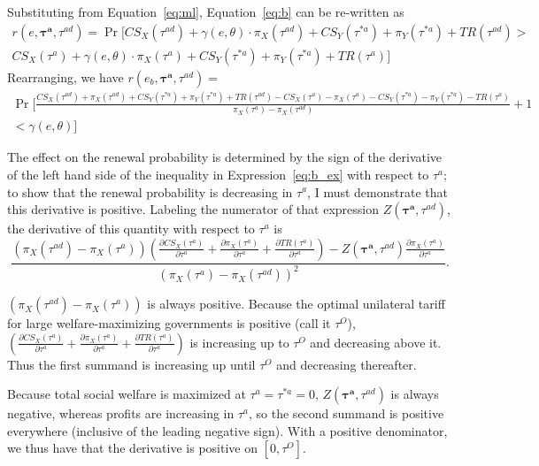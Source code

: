 \documentclass[10pt]{article}
\newcommand{\ve}{\theta}
\newcommand{\bta}{\bm{\tau^a}}
\newcommand{\tad}{\tau^{ad}}
\newcommand{\ga}{\gamma}
\begin{document}
Substituting from Equation~\ref{eq:ml}, Equation~\ref{eq:b} can be re-written as
\begin{multline}  
  r(e,\bta,\tad) = \Pr [ \mathit{CS}_X(\tad) + \ga(e,\ve) \cdot \pi_X(\tad) + \mathit{CS}_Y(\tau^{*a}) + \pi_Y(\tau^{*a}) + \mathit{TR}(\tad) >  \\ \mathit{CS}_X(\tau^a) + \ga(e,\ve) \cdot \pi_X(\tau^a) + \mathit{CS}_Y(\tau^{*a}) + \pi_Y(\tau^{*a}) + \mathit{TR}(\tau^a) ]
\end{multline}
Rearranging, we have $r(e_b,\bta,\tad) = $
\begin{multline}  
  \textstyle \Pr \Big[ \frac{\mathit{CS}_X(\tad) + \pi_X(\tad) + \mathit{CS}_Y(\tau^{*a}) + \pi_Y(\tau^{*a}) + \mathit{TR}(\tad)  -\mathit{CS}_X(\tau^a) - \pi_X(\tau^a) - \mathit{CS}_Y(\tau^{*a}) - \pi_Y(\tau^{*a}) - \mathit{TR}(\tau^a)}{\pi_X(\tau^a) - \pi_X(\tad)} + 1 \\ \textstyle < \ga(e,\ve) \Big]
  \label{eq:b_ex}
\end{multline}

The effect on the renewal probability is determined by the sign of the derivative of the left hand side of the inequality in Expression~\ref{eq:b_ex} with respect to $\tau^a$; to show that the renewal probability is decreasing in $\tau^a$, I must demonstrate that this derivative is positive. Labeling the numerator of that expression $Z(\bta,\tad)$, the derivative of this quantity with respect to $\tau^{a}$ is 
\begin{equation}
  \frac{\left(\pi_X(\tad) - \pi_X(\tau^a)\right)\left(\frac{\partial \mathit{CS}_X(\tau^{a})}{\partial \tau^{a}} + \frac{\partial \pi_X(\tau^a)}{\partial \tau^{a}} + \frac{\partial \mathit{TR}(\tau^{a})}{\partial \tau^{a}}\right) - Z(\bta,\tad) \frac{\partial \pi_X(\tau^a)}{\partial \tau^a}}{\left(\pi_X(\tau^a) - \pi_X(\tad)\right)^2}.
  \label{appex:a}
\end{equation}

\noindent $\left(\pi_X(\tad) - \pi_X(\tau^a)\right)$ is always positive. Because the optimal unilateral tariff for large welfare-maximizing governments is positive (call it $\tau^O$), $\left(\frac{\partial \mathit{CS}_X(\tau^{a})}{\partial \tau^{a}} + \frac{\partial \pi_X(\tau^a)}{\partial \tau^{a}} + \frac{\partial \mathit{TR}(\tau^{a})}{\partial \tau^{a}}\right)$ is increasing up to $\tau^O$ and decreasing above it. Thus the first summand is increasing up until $\tau^O$ and decreasing thereafter.

Because total social welfare is maximized at $\tau^a = \tau^{*a} = 0$, $Z(\bta,\tad)$ is always negative, whereas profits are increasing in $\tau^a$, so the second summand is positive everywhere (inclusive of the leading negative sign). With a positive denominator, we thus have that the derivative is positive on $[0,\tau^O]$.
\end{document}
